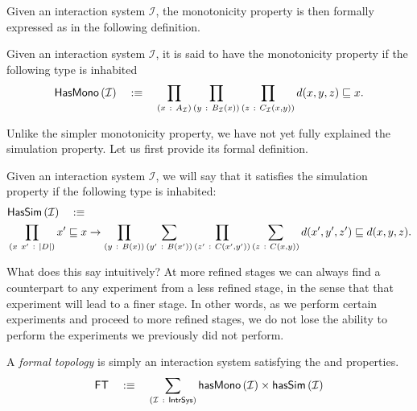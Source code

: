 Given an interaction system $\mathcal{I}$, the monotonicity property is then formally
expressed as in the following definition.
\begin{defn}\label{defn:mono}
  Given an interaction system $\mathcal{I}$, it is said to have the monotonicity property
  if the following type is inhabited
  \begin{equation*}
    \mathsf{HasMono}\left( \mathcal{I} \right) \quad\is\quad
    \pity{x}{A_{\mathcal{I}}}{\pity{y}{B_{\mathcal{I}}(x)}{\pity{z}{C_{\mathcal{I}}(x, y)}{
      d(x, y, z) \sqsubseteq x}}.
    }
  \end{equation*}
\end{defn}

Unlike the simpler monotonicity property, we have not yet fully explained the simulation
property. Let us first provide its formal definition.
\begin{defn}\label{defn:sim}
  Given an interaction system $\mathcal{I}$, we will say that it satisfies the simulation
  property if the following type is inhabited:
  \begin{align*}
    &\mathsf{HasSim}\left( \mathcal{I} \right) \quad\is\\
    &\pity{x~x'}{\abs{D}}{
      x' \sqsubseteq x \rightarrow \pity{y}{B(x)}{
        \sigmaty{y'}{B(x')}{
          \pity{z'}{C(x', y')}{
            \sigmaty{z}{C(x, y)}{
              d(x', y', z') \sqsubseteq d(x, y, z)
            }
          }
        }
      }
    }.
  \end{align*}
\end{defn}
What does this say intuitively? At more refined stages we can always find a counterpart to
any experiment from a less refined stage, in the sense that that experiment will lead to a
finer stage. In other words, as we perform certain experiments and proceed to more refined
stages, we do not lose the ability to perform the experiments we previously did not
perform.

\begin{defn}\label{defn:formal-topo}
  A \emph{formal topology} is simply an interaction system satisfying the \vermono{} and
  \versim{} properties.
  \begin{align*}
    \mathsf{FT} \quad\is\quad \sigmaty{\mathcal{I}}{\mathsf{IntrSys}}{
        \hasmono{\mathcal{I}} \times \hassim{\mathcal{I}}
    }
  \end{align*}
\end{defn}

